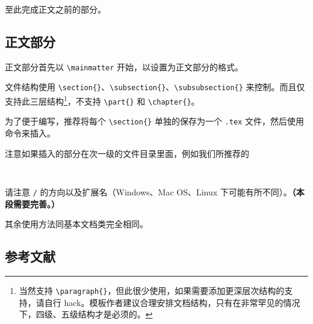 \documentclass[%
               print, 
              ]{xjtubsc}
\begin{document}
至此完成正文之前的部分。

\subsection{正文部分}

正文部分首先以 \verb|\mainmatter| 开始，以设置为正文部分的格式。

文件结构使用 \verb|\section{}|、\verb|\subsection{}|、\verb|\subsubsection{}| 来控制。而且仅支持此三层结构\footnote{当然支持 \verb|\paragraph{}|，但此很少使用，如果需要添加更深层次结构的支持，请自行 hack。模板作者建议合理安排文档结构，只有在非常罕见的情况下，四级、五级结构才是必须的。}，不支持 \verb|\part{}| 和 \verb|\chapter{}|。

为了便于编写，推荐将每个 \verb|\section{}| 单独的保存为一个 \verb|.tex| 文件，然后使用 \verb|| 命令来插入。

注意如果插入的部分在次一级的文件目录里面，例如我们所推荐的
\begin{verbatim}
    
\end{verbatim}
请注意 \verb|/| 的方向以及扩展名（Windows、Mac OS、Linux 下可能有所不同）。\textbf{（本段需要完善。）}

其余使用方法同基本文档类完全相同。

\subsection{参考文献}
\end{document}
